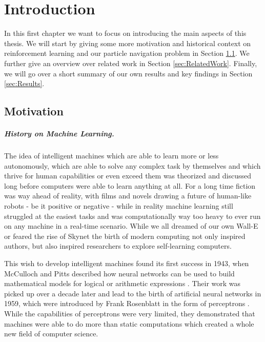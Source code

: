 \chapter{Introduction} \label{chp:Introduction}
In this first chapter we want to focus on introducing the main aspects of this thesis. We will start by giving some more motivation and historical context on reinforcement learning and our particle navigation problem in Section \ref{sec:Motivation}. We further give an overview over related work in Section \ref{sec:RelatedWork}. Finally, we will go over a short summary of our own results and key findings in Section \ref{sec:Results}.  

\section{Motivation} \label{sec:Motivation}
\paragraph{History on Machine Learning.}
The idea of intelligent machines which are able to learn more or less autonomously, which are able to solve any complex task by themselves and which thrive for human capabilities or even exceed them was theorized and discussed long before computers were able to learn anything at all. For a long time fiction was way ahead of reality, with films and novels drawing a future of human-like robots - be it positive or negative - while in reality machine learning still struggled at the easiest tasks and was computationally way too heavy to ever run on any machine in a real-time scenario. While we all dreamed of our own Wall-E or feared the rise of Skynet the birth of modern computing not only inspired authors, but also inspired researchers to explore self-learning computers.

 This wish to develop intelligent machines found its first success in 1943, when McCulloch and Pitts described how neural networks can be used to build mathematical models for logical or arithmetic expressions \cite{mcculloch1943logical}. Their work was picked up over a decade later and lead to the birth of artificial neural networks in 1959, which were introduced by Frank Rosenblatt in the form of perceptrons \cite{rosenblatt1958perceptron}. While the capabilities of perceptrons were very limited, they demonstrated that machines were able to do more than static computations which created a whole new field of computer science.

